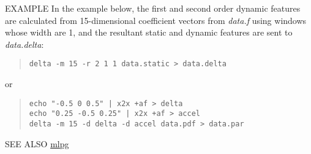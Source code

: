 \begin{qsection}{EXAMPLE}
In the example below, the first and second order dynamic features are calculated from 15-dimensional
coefficient vectors from {\em data.f} using windows whose width are 1, and the resultant 
static and dynamic features are sent to {\em data.delta}:
 \begin{quote}
	\verb!delta -m 15 -r 2 1 1 data.static > data.delta!
 \end{quote}
	or
 \begin{quote}
	\verb!echo "-0.5 0 0.5" | x2x +af > delta! \\
	\verb!echo "0.25 -0.5 0.25" | x2x +af > accel! \\
	\verb!delta -m 15 -d delta -d accel data.pdf > data.par!
 \end{quote}
\end{qsection}

\begin{qsection}{SEE ALSO}
\hyperlink{average}{mlpg}
\end{qsection}
